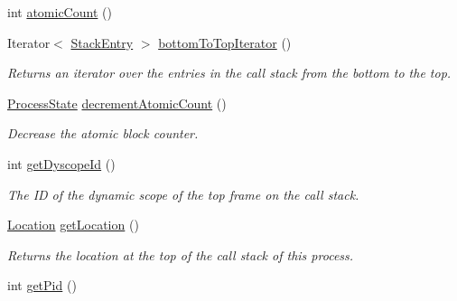 \begin{DoxyCompactItemize}
\item 
int \hyperlink{classedu_1_1udel_1_1cis_1_1vsl_1_1civl_1_1state_1_1common_1_1immutable_1_1ImmutableProcessState_ab27251e76ea8448b55e9d6eccb97eb36}{atomic\+Count} ()
\item 
Iterator$<$ \hyperlink{interfaceedu_1_1udel_1_1cis_1_1vsl_1_1civl_1_1state_1_1IF_1_1StackEntry}{Stack\+Entry} $>$ \hyperlink{classedu_1_1udel_1_1cis_1_1vsl_1_1civl_1_1state_1_1common_1_1immutable_1_1ImmutableProcessState_a8179f2d3d062aaf7e413c3053e321c1d}{bottom\+To\+Top\+Iterator} ()
\begin{DoxyCompactList}\small\item\em Returns an iterator over the entries in the call stack from the bottom to the top. \end{DoxyCompactList}\item 
\hyperlink{interfaceedu_1_1udel_1_1cis_1_1vsl_1_1civl_1_1state_1_1IF_1_1ProcessState}{Process\+State} \hyperlink{classedu_1_1udel_1_1cis_1_1vsl_1_1civl_1_1state_1_1common_1_1immutable_1_1ImmutableProcessState_a6d2dd160f75fccf28af49896cf9424eb}{decrement\+Atomic\+Count} ()
\begin{DoxyCompactList}\small\item\em Decrease the atomic block counter. \end{DoxyCompactList}\item 
int \hyperlink{classedu_1_1udel_1_1cis_1_1vsl_1_1civl_1_1state_1_1common_1_1immutable_1_1ImmutableProcessState_acfd5b3aac9b5caf5c810cddf6eecabfe}{get\+Dyscope\+Id} ()
\begin{DoxyCompactList}\small\item\em The I\+D of the dynamic scope of the top frame on the call stack. \end{DoxyCompactList}\item 
\hyperlink{interfaceedu_1_1udel_1_1cis_1_1vsl_1_1civl_1_1model_1_1IF_1_1location_1_1Location}{Location} \hyperlink{classedu_1_1udel_1_1cis_1_1vsl_1_1civl_1_1state_1_1common_1_1immutable_1_1ImmutableProcessState_a952ce1461d69786f6e72bcfbed82cee2}{get\+Location} ()
\begin{DoxyCompactList}\small\item\em Returns the location at the top of the call stack of this process. \end{DoxyCompactList}\item 
int \hyperlink{classedu_1_1udel_1_1cis_1_1vsl_1_1civl_1_1state_1_1common_1_1immutable_1_1ImmutableProcessState_a5b4cf2eb8a50e7a05302b8e69e746a9a}{get\+Pid} ()

\end{DoxyCompactItemize}
